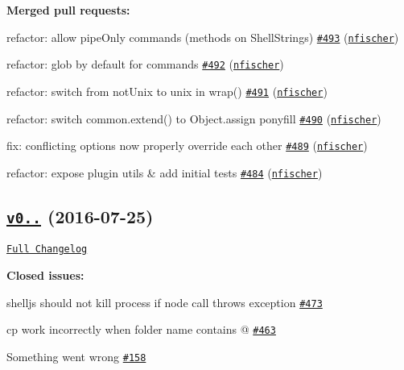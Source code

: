 {\bfseries Merged pull requests\+:}


\begin{DoxyItemize}
\item refactor\+: allow pipe\+Only commands (methods on Shell\+Strings) \href{https://github.com/shelljs/shelljs/pull/493}{\tt \#493} (\href{https://github.com/nfischer}{\tt nfischer})
\item refactor\+: glob by default for commands \href{https://github.com/shelljs/shelljs/pull/492}{\tt \#492} (\href{https://github.com/nfischer}{\tt nfischer})
\item refactor\+: switch from not\+Unix to unix in wrap() \href{https://github.com/shelljs/shelljs/pull/491}{\tt \#491} (\href{https://github.com/nfischer}{\tt nfischer})
\item refactor\+: switch common.\+extend() to Object.\+assign ponyfill \href{https://github.com/shelljs/shelljs/pull/490}{\tt \#490} (\href{https://github.com/nfischer}{\tt nfischer})
\item fix\+: conflicting options now properly override each other \href{https://github.com/shelljs/shelljs/pull/489}{\tt \#489} (\href{https://github.com/nfischer}{\tt nfischer})
\item refactor\+: expose plugin utils \& add initial tests \href{https://github.com/shelljs/shelljs/pull/484}{\tt \#484} (\href{https://github.com/nfischer}{\tt nfischer})
\end{DoxyItemize}

\subsection*{\href{https://github.com/shelljs/shelljs/tree/v0.7.2}{\tt v0..} (2016-\/07-\/25)}

\href{https://github.com/shelljs/shelljs/compare/v0.7.1...v0.7.2}{\tt Full Changelog}

{\bfseries Closed issues\+:}


\begin{DoxyItemize}
\item shelljs should not kill process if node call throws exception \href{https://github.com/shelljs/shelljs/issues/473}{\tt \#473}
\item {\ttfamily cp} work incorrectly when folder name contains \textquotesingle{}@\textquotesingle{} \href{https://github.com/shelljs/shelljs/issues/463}{\tt \#463}
\item Something went wrong \href{https://github.com/shelljs/shelljs/issues/158}{\tt \#158}
\end{DoxyItemize}

